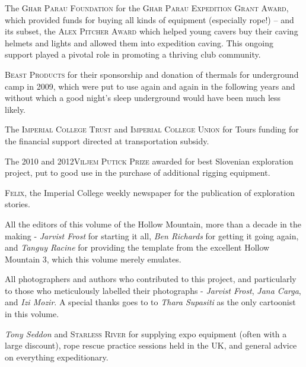 \begin{citemize}
\item The \textsc{Ghar Parau Foundation} for the \textsc{Ghar Parau Expedition Grant Award}, which provided funds for buying all kinds of equipment (especially rope!) -- and its subset, the \textsc{Alex Pitcher Award} which helped young cavers buy their caving helmets and lights and allowed them into expedition caving. This ongoing support played a pivotal role in promoting a thriving club community.
\item \textsc{Beast Products} for their sponsorship and donation of thermals for underground camp in 2009, which were put to use again and again in the following years and without which a good night's sleep underground would have been much less likely.
\item The \textsc{Imperial College Trust} and  \textsc{Imperial College Union} for Tours funding for the financial support directed at transportation subsidy.

\item The 2010 and 2012\textsc{Viljem Putick Prize} awarded for best Slovenian exploration project, put to good use in the purchase of additional rigging equipment.

\item \textsc{Felix}, the Imperial College weekly newspaper for the publication of exploration stories.


\mydelimiter

\item All the editors of this volume of the Hollow Mountain, more than a decade in the making - \textit{Jarvist Frost} for starting it all, \textit{Ben Richards} for getting it going again, and \textit{Tanguy Racine} for providing the template from the excellent Hollow Mountain 3, which this volume merely emulates. 

\item All photographers and authors who contributed to this project, and particularly to those who meticulously labelled their photographs - \textit{Jarvist Frost}, \textit{Jana Carga}, and \textit{Izi Mozir}. A special thanks goes to to \textit{Thara Supasiti} as the only cartoonist in this volume.

\item \textit{Tony Seddon} and \textsc{Starless River} for supplying expo equipment (often with a large discount), rope rescue practice sessions held in the UK, and general advice on everything expeditionary.


\end{citemize}
